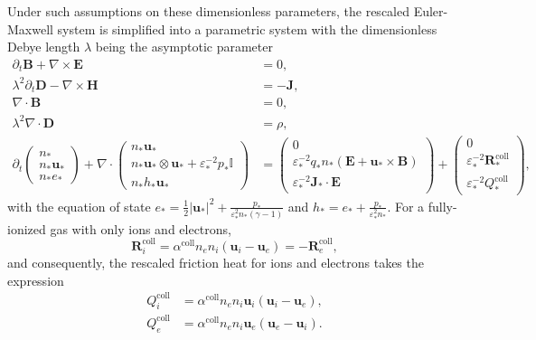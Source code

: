\documentclass{article}
\begin{document}
Under such assumptions on these dimensionless parameters, the rescaled Euler-Maxwell system is simplified into a parametric system with the dimensionless Debye length $\lambda$ being the asymptotic parameter
\begin{subequations}
\begin{align}
    \partial_t \mathbf{B} + \nabla \times \mathbf{E} &= 0, \label{equ:maxwell_faraday_rescaled} \\ 
    \lambda^2 \partial_t \mathbf{D} - \nabla \times \mathbf{H} &= - \mathbf{J}, \label{equ:maxwell_ampere_rescaled} \\
    \nabla \cdot \mathbf{B} &= 0,  \label{equ:maxwell_gauss_B_rescaled}\\
    \lambda^2 \nabla \cdot \mathbf{D} &= \rho, \label{equ:maxwell_gauss_D_rescaled} \\
    \partial_t
    \begin{pmatrix}
    n_* \\
    n_* \mathbf{u}_* \\
    n_* e_*
    \end{pmatrix}
    + \nabla \cdot
    \begin{pmatrix}
    n_* \mathbf{u}_* \\
    n_* \mathbf{u}_* \otimes \mathbf{u}_* + \varepsilon_*^{-2} p_*\mathbb{I} \\
    n_* h_* \mathbf{u}_*
    \end{pmatrix}
    &=
    \begin{pmatrix}
    0 \\
    \varepsilon_*^{-2} q_* n_* (\mathbf{E} + \mathbf{u}_* \times \mathbf{B}) \\
    \varepsilon_*^{-2} \mathbf{J}_* \cdot \mathbf{E}
    \end{pmatrix}+
    \begin{pmatrix}
    0 \\
    \varepsilon_*^{-2}\mathbf{R}_*^{\text{coll}} \\
    \varepsilon_*^{-2}Q_*^{\text{coll}} 
    \end{pmatrix}, \label{equ:euler_rescaled}
\end{align}
\end{subequations}
with the equation of state $e_* = \frac{1}{2}|\mathbf{u_*}|^2 + \frac{p_*}{\varepsilon^2_* n_* (\gamma - 1)}$ and $h_* = e_* + \frac{p_*}{\varepsilon^2_* n_*}$. For a fully-ionized gas with only ions and electrons, 
\begin{equation} \label{equ:collision_rescaled} 
    \mathbf{R}_i^{\text{coll}} = \alpha^{\text{coll}}n_en_i(\mathbf{u}_i - \mathbf{u}_e) = - \mathbf{R}_e^{\text{coll}},
\end{equation}
and consequently, the rescaled friction heat for ions and electrons takes the expression
\begin{align*} 
    Q_i^{\text{coll}} &= \alpha^{\text{coll}}n_en_i \mathbf{u}_i (\mathbf{u}_i - \mathbf{u}_e), \\
    Q_e^{\text{coll}} &= \alpha^{\text{coll}}n_en_i \mathbf{u}_e (\mathbf{u}_e - \mathbf{u}_i).
\end{align*}
\end{document}
